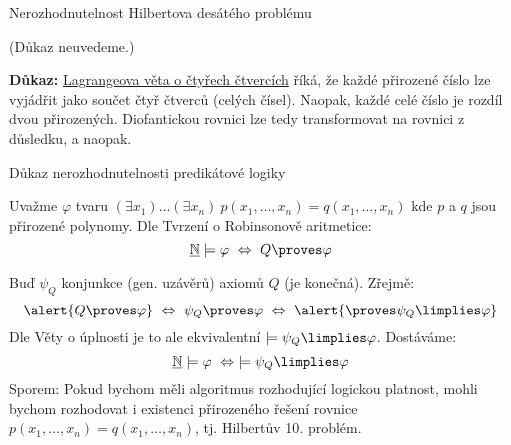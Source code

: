 \documentclass{beamer}
\begin{document}
\begin{frame}{Nerozhodnutelnost Hilbertova desátého problému}

    \pause

    (Důkaz neuvedeme.)

    \medskip

    \pause
    
    \pause
    \textbf{Důkaz:} \alert{\href{https://en.wikipedia.org/wiki/Lagrange\%27s_four-square_theorem}{Lagrangeova věta o čtyřech čtvercích}} říká, že každé přirozené číslo lze vyjádřit jako součet čtyř čtverců (celých čísel). Naopak, každé celé číslo je rozdíl dvou přirozených. Diofantickou rovnici lze tedy transformovat na rovnici z důsledku, a naopak.\hfill\qedsymbol

\end{frame}


\begin{frame}{Důkaz nerozhodnutelnosti predikátové logiky}

    \pause
    Uvažme $\varphi$ tvaru $(\exists x_1)\dots(\exists x_n)\ p(x_1,\dots,x_n)=q(x_1,\dots,x_n)$ 
    kde $p$ a $q$ jsou přirozené polynomy. Dle Tvrzení o Robinsonově aritmetice:
    $$
    \underline{\mathbb N}\models \varphi\ \Leftrightarrow\  Q\proves \varphi
    $$

    \pause
    Buď $\psi_Q$ konjunkce (gen. uzávěrů) axiomů $Q$ (je konečná). Zřejmě: 
    $$
    \alert{Q\proves\varphi}\ \Leftrightarrow\ \psi_Q\proves\varphi\ \Leftrightarrow\ \alert{\proves\psi_Q\limplies\varphi}
    $$
    \pause
    Dle Věty o úplnosti je to ale ekvivalentní \alert{$\models\psi_Q\limplies\varphi$}. Dostáváme:
    $$
    \underline{\mathbb N}\models \varphi\ \Leftrightarrow\ \models \psi_Q\limplies\varphi
    $$
    \pause
    \alert{Sporem:} Pokud bychom měli algoritmus rozhodující logickou platnost, mohli bychom rozhodovat i existenci přirozeného řešení rovnice $p(x_1,\dots,x_n)=q(x_1,\dots,x_n)$, tj. Hilbertův 10. problém.\hfill\qedsymbol

\end{frame}
\end{document}
